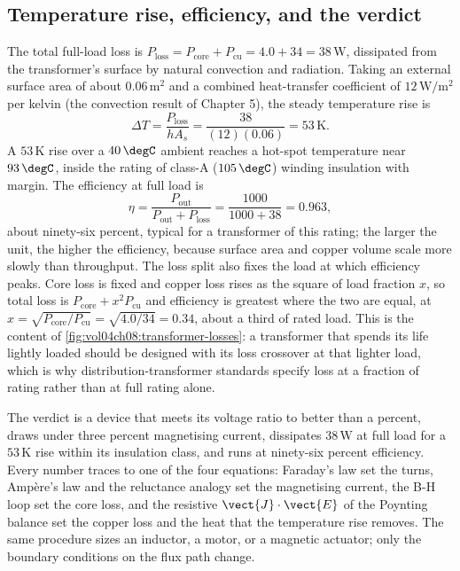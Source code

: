 \subsection{Temperature rise, efficiency, and the verdict}

The total full-load loss is $P_{\text{loss}} = P_{\text{core}} +
P_{\text{cu}} = 4.0 + 34 = 38\,\si{\watt}$, dissipated from the
transformer's surface by natural convection and radiation. Taking an
external surface area of about $0.06\,\si{\meter\squared}$ and a
combined heat-transfer coefficient of $12\,\si{\watt\per\meter\squared}$
per kelvin (the convection result of Chapter 5), the steady temperature
rise is
\[
\Delta T = \frac{P_{\text{loss}}}{h A_s} = \frac{38}{(12)(0.06)} =
53\,\si{\kelvin}.
\]
A $53\,\si{\kelvin}$ rise over a $40\,\degC$ ambient reaches a
hot-spot temperature near $93\,\degC$, inside the rating of class-A
($105\,\degC$) winding insulation with margin. The efficiency at full
load is
\[
\eta = \frac{P_{\text{out}}}{P_{\text{out}} + P_{\text{loss}}} =
\frac{1000}{1000 + 38} = 0.963,
\]
about ninety-six percent, typical for a transformer of this rating; the
larger the unit, the higher the efficiency, because surface area and
copper volume scale more slowly than throughput. The loss split also
fixes the load at which efficiency peaks. Core loss is fixed and copper
loss rises as the square of load fraction $x$, so total loss is
$P_{\text{core}} + x^{2}P_{\text{cu}}$ and efficiency is greatest where
the two are equal, at $x = \sqrt{P_{\text{core}}/P_{\text{cu}}} =
\sqrt{4.0/34} = 0.34$, about a third of rated load. This is the content
of \cref{fig:vol04ch08:transformer-losses}: a transformer that spends
its life lightly loaded should be designed with its loss crossover at
that lighter load, which is why distribution-transformer standards
specify loss at a fraction of rating rather than at full rating alone.



The verdict is a device that meets its voltage ratio to better than a
percent, draws under three percent magnetising current, dissipates
$38\,\si{\watt}$ at full load for a $53\,\si{\kelvin}$ rise within its
insulation class, and runs at ninety-six percent efficiency. Every
number traces to one of the four equations: Faraday's law set the
turns, Amp\`ere's law and the reluctance analogy set the magnetising
current, the B-H loop set the core loss, and the resistive
$\vect{J}\cdot\vect{E}$ of the Poynting balance set the copper loss and
the heat that the temperature rise removes. The same procedure sizes an
inductor, a motor, or a magnetic actuator; only the boundary conditions
on the flux path change.

